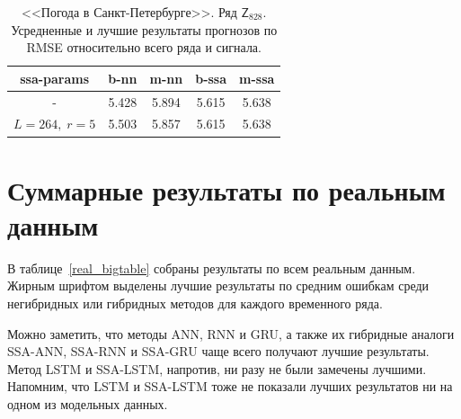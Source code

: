 \documentclass[specialist,
               substylefile = spbu.rtx,
               subf,href,colorlinks=true, 12p]{disser}
\begin{document}
\begin{table}[h]
	\captionsetup{justification=centering}
	\caption{<<Погода в Санкт-Петербурге>>. Ряд $\mathsf{Z}_{828}$. Усредненные и лучшие результаты прогнозов по RMSE относительно всего ряда и сигнала.}
	\begin{center}
		\begin{tabular}{ccccc}
			\toprule
			{ssa-params} &  b-nn &  m-nn &  b-ssa &  m-ssa \\
			\midrule
			-           & 5.428 & 5.894 &  5.615 &  5.638 \\
			$L = 264, \; r = 5$    & 5.503 & 5.857 &  5.615 &  5.638 \\
			\bottomrule
		\end{tabular}
	\end{center}
	\label{tweather}
\end{table}

\section{Суммарные результаты по реальным данным}
В таблице~\ref{real_bigtable} собраны результаты по всем реальным данным. Жирным шрифтом выделены лучшие результаты по средним ошибкам среди негибридных или гибридных методов для каждого временного ряда.

Можно заметить, что методы ANN, RNN и GRU, а также их гибридные аналоги SSA-ANN, SSA-RNN и SSA-GRU чаще всего получают лучшие результаты. Метод LSTM и SSA-LSTM, напротив, ни разу не были замечены лучшими. Напомним, что LSTM и SSA-LSTM тоже не показали лучших результатов ни на одном из модельных данных.
\end{document}
